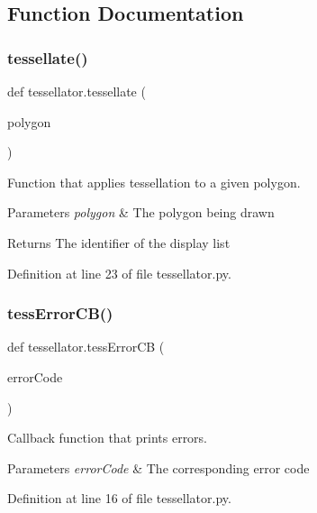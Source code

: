 \subsection{Function Documentation}
\mbox{\label{namespacetessellator_a9a6e675f7596610cd3118348185ef51f}} 
\subsubsection{\texorpdfstring{tessellate()}{tessellate()}}
{\footnotesize\ttfamily def tessellator.\+tessellate (\begin{DoxyParamCaption}\item[{}]{polygon }\end{DoxyParamCaption})}



Function that applies tessellation to a given polygon. 


\begin{DoxyParams}{Parameters}
{\em polygon} & The polygon being drawn \\
\hline
\end{DoxyParams}
\begin{DoxyReturn}{Returns}
The identifier of the display list 
\end{DoxyReturn}


Definition at line 23 of file tessellator.\+py.

\mbox{\label{namespacetessellator_a5047a345487c0e5eb12f5c4b39352aee}} 
\subsubsection{\texorpdfstring{tess\+Error\+C\+B()}{tessErrorCB()}}
{\footnotesize\ttfamily def tessellator.\+tess\+Error\+CB (\begin{DoxyParamCaption}\item[{}]{error\+Code }\end{DoxyParamCaption})}



Callback function that prints errors. 


\begin{DoxyParams}{Parameters}
{\em error\+Code} & The corresponding error code \\
\hline
\end{DoxyParams}


Definition at line 16 of file tessellator.\+py.

